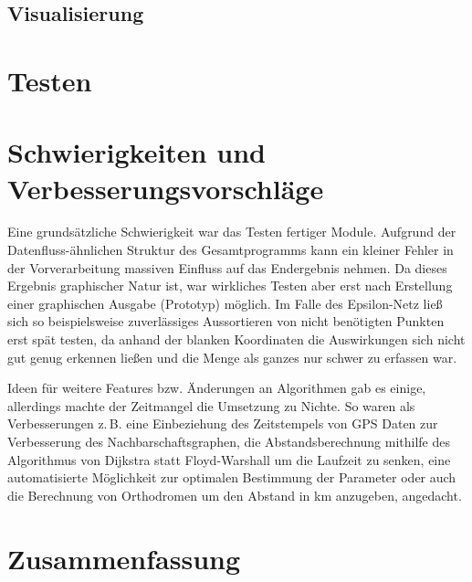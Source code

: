 \documentclass[parskip=half,
 fontsize=12pt, bibtotoc,
 ngerman]
 {article}
\begin{document}
\subsection{Visualisierung}

\section{Testen}

\section{Schwierigkeiten und Verbesserungsvorschläge}

Eine grundsätzliche Schwierigkeit war das Testen fertiger Module.
Aufgrund der Datenfluss-ähnlichen Struktur des Gesamtprogramms kann
ein kleiner Fehler in der Vorverarbeitung massiven Einfluss
auf das Endergebnis nehmen. Da dieses Ergebnis graphischer Natur ist,
war wirkliches Testen aber erst nach Erstellung einer graphischen Ausgabe
(Prototyp) möglich. Im Falle des Epsilon-Netz ließ sich so beispielsweise 
zuverlässiges Aussortieren von nicht benötigten Punkten erst spät testen,
da anhand der blanken Koordinaten die Auswirkungen sich nicht gut genug
erkennen ließen und die Menge als ganzes nur schwer zu erfassen war.

Ideen für weitere Features bzw. Änderungen an Algorithmen gab es einige, 
allerdings machte der Zeitmangel die Umsetzung zu Nichte. So waren
als Verbesserungen z.\,B. eine Einbeziehung des Zeitstempels von GPS Daten
zur Verbesserung des Nachbarschaftsgraphen, die Abstandsberechnung mithilfe des
Algorithmus von Dijkstra statt Floyd-Warshall um die Laufzeit zu senken,
eine automatisierte Möglichkeit zur optimalen Bestimmung der Parameter oder
auch die Berechnung von Orthodromen um den Abstand in km anzugeben, angedacht.

\section{Zusammenfassung}
\printbibliography
\end{document}
